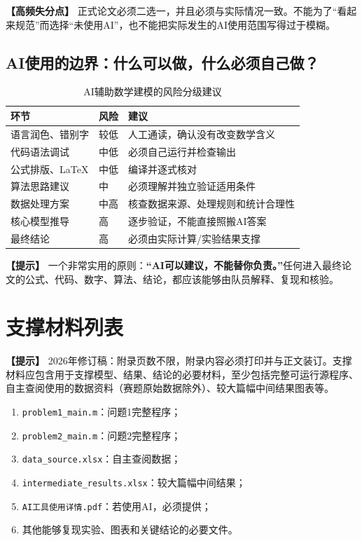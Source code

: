 \documentclass[12pt,a4paper]{article}
\newcommand{\tip}[1]{\par\noindent\textbf{【提示】} #1\par}
\newcommand{\warning}[1]{\par\noindent\textbf{【高频失分点】} #1\par}
\begin{document}
\warning{正式论文必须二选一，并且必须与实际情况一致。不能为了“看起来规范”而选择“未使用AI”，也不能把实际发生的AI使用范围写得过于模糊。}

\subsection*{AI使用的边界：什么可以做，什么必须自己做？}

\begin{table}[H]
\centering
\caption{AI辅助数学建模的风险分级建议}
\begin{tabular}{p{3.5cm}p{1cm}p{7.5cm}}
\toprule
环节 & 风险 & 建议 \\
\midrule
语言润色、错别字 & 较低 & 人工通读，确认没有改变数学含义 \\
代码语法调试 & 中低 & 必须自己运行并检查输出 \\
公式排版、LaTeX & 中低 & 编译并逐式核对 \\
算法思路建议 & 中 & 必须理解并独立验证适用条件 \\
数据处理方案 & 中高 & 核查数据来源、处理规则和统计合理性 \\
核心模型推导 & 高 & 逐步验证，不能直接照搬AI答案 \\
最终结论 & 高 & 必须由实际计算/实验结果支撑 \\
\bottomrule
\end{tabular}
\end{table}

\tip{一个非常实用的原则：\textbf{“AI可以建议，不能替你负责。”}任何进入最终论文的公式、代码、数字、算法、结论，都应该能够由队员解释、复现和核验。}

\clearpage
\appendix
\section{支撑材料列表}

\tip{2026年修订稿：附录页数不限，附录内容必须打印并与正文装订。支撑材料应包含用于支撑模型、结果、结论的必要材料，至少包括完整可运行源程序、自主查阅使用的数据资料（赛题原始数据除外）、较大篇幅中间结果图表等。}

\begin{enumerate}
  \item \texttt{problem1\_main.m}：问题1完整程序；
  \item \texttt{problem2\_main.m}：问题2完整程序；
  \item \texttt{data\_source.xlsx}：自主查阅数据；
  \item \texttt{intermediate\_results.xlsx}：较大篇幅中间结果；
  \item \texttt{AI工具使用详情.pdf}：若使用AI，必须提供；
  \item 其他能够复现实验、图表和关键结论的必要文件。
\end{enumerate}
\end{document}
